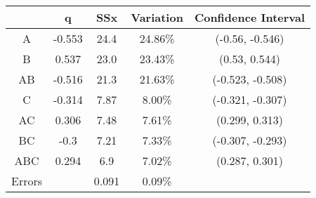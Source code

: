 \begin{center}
\begin{tabular}{|c|c|c|c|c|}
\cline{2-5}
\multicolumn{1}{c|}{} & q & SSx & Variation & Confidence Interval \\
\hline
A&-0.553&24.4&24.86\% &(-0.56, -0.546) \\
\hline
B&0.537&23.0&23.43\% &(0.53, 0.544) \\
\hline
AB&-0.516&21.3&21.63\% &(-0.523, -0.508) \\
\hline
C&-0.314&7.87&8.00\% &(-0.321, -0.307) \\
\hline
AC&0.306&7.48&7.61\% &(0.299, 0.313) \\
\hline
BC&-0.3&7.21&7.33\% &(-0.307, -0.293) \\
\hline
ABC&0.294&6.9&7.02\% &(0.287, 0.301) \\
\hline
Errors& &0.091&0.09\% & \\
\hline
\end{tabular}
\end{center}
